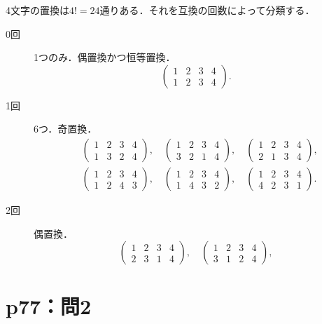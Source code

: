 \documentclass[a4paper,10pt,fleqn]{ltjsarticle}
\begin{document}
\begin{tleftbar}
  4文字の置換は$4!=24$通りある．それを互換の回数によって分類する．
  \begin{description}
    \item[0回] 1つのみ．偶置換かつ恒等置換．
          \[
            \begin{pmatrix} 1 & 2 & 3 &4 \\ 1 & 2 & 3 &4\end{pmatrix}.
          \]
    \item [1回] 6つ．奇置換．
          \begin{align*}
             & \begin{pmatrix} 1 & 2 & 3 & 4\\ 1 & 3 & 2 & 4\end{pmatrix},\quad
            \begin{pmatrix} 1 & 2 & 3 &4 \\ 3 & 2 & 1  & 4\end{pmatrix},\quad
            \begin{pmatrix} 1 & 2 & 3 & 4\\ 2 & 1 & 3 & 4\end{pmatrix},         \\
             & \begin{pmatrix} 1 & 2 & 3 & 4\\ 1 & 2 & 4 & 3\end{pmatrix},\quad
            \begin{pmatrix} 1 & 2 & 3 & 4\\ 1 & 4 & 3 & 2\end{pmatrix},\quad
            \begin{pmatrix} 1 & 2 & 3 & 4\\ 4 & 2 & 3 & 1\end{pmatrix}.
          \end{align*}
    \item [2回] 偶置換．
          \[
            \begin{pmatrix} 1 & 2 & 3 & 4 \\ 2 & 3 & 1 & 4\end{pmatrix},\quad
            \begin{pmatrix} 1 & 2 & 3 & 4 \\ 3 & 1 & 2 & 4 \end{pmatrix},
          \]
  \end{description}
\end{tleftbar}

\section*{p77：問2}
\end{document}
